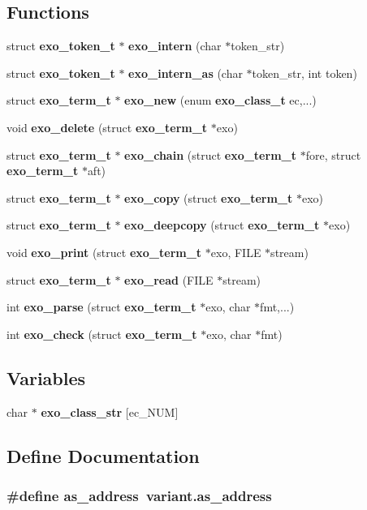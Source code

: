 \subsection*{Functions}
\begin{CompactItemize}
\item 
struct {\bf exo\_\-token\_\-t} $\ast$ {\bf exo\_\-intern} (char $\ast$token\_\-str)
\item 
struct {\bf exo\_\-token\_\-t} $\ast$ {\bf exo\_\-intern\_\-as} (char $\ast$token\_\-str, int token)
\item 
struct {\bf exo\_\-term\_\-t} $\ast$ {\bf exo\_\-new} (enum {\bf exo\_\-class\_\-t} ec,...)
\item 
void {\bf exo\_\-delete} (struct {\bf exo\_\-term\_\-t} $\ast$exo)
\item 
struct {\bf exo\_\-term\_\-t} $\ast$ {\bf exo\_\-chain} (struct {\bf exo\_\-term\_\-t} $\ast$fore, struct {\bf exo\_\-term\_\-t} $\ast$aft)
\item 
struct {\bf exo\_\-term\_\-t} $\ast$ {\bf exo\_\-copy} (struct {\bf exo\_\-term\_\-t} $\ast$exo)
\item 
struct {\bf exo\_\-term\_\-t} $\ast$ {\bf exo\_\-deepcopy} (struct {\bf exo\_\-term\_\-t} $\ast$exo)
\item 
void {\bf exo\_\-print} (struct {\bf exo\_\-term\_\-t} $\ast$exo, FILE $\ast$stream)
\item 
struct {\bf exo\_\-term\_\-t} $\ast$ {\bf exo\_\-read} (FILE $\ast$stream)
\item 
int {\bf exo\_\-parse} (struct {\bf exo\_\-term\_\-t} $\ast$exo, char $\ast$fmt,...)
\item 
int {\bf exo\_\-check} (struct {\bf exo\_\-term\_\-t} $\ast$exo, char $\ast$fmt)
\end{CompactItemize}
\subsection*{Variables}
\begin{CompactItemize}
\item 
char $\ast$ {\bf exo\_\-class\_\-str} [ec\_\-NUM]
\end{CompactItemize}


\subsection{Define Documentation}
\subsubsection[{as\_\-address}]{\setlength{\rightskip}{0pt plus 5cm}\#define as\_\-address~variant.as\_\-address}\label{libexo_8h_becb203382d32d7077430f7be83921d6}




